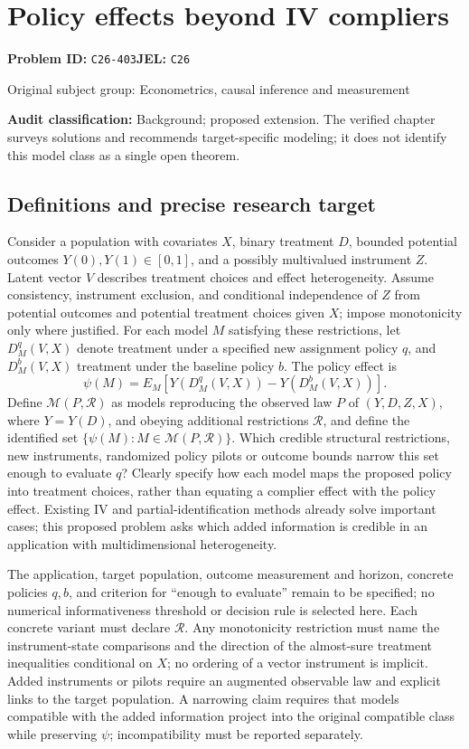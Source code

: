 \documentclass[11pt,a4paper]{article}
\begin{document}
\section*{Policy effects beyond IV compliers}
\textbf{Problem ID:} \texttt{C26-403}\quad \textbf{JEL:} \texttt{C26}\par
\label{problem:OP-0424}
{\sffamily\small\color{muted}Original subject group: Econometrics, causal inference and measurement\par}
\label{definitions:problem:30007706}
\textbf{Audit classification:} Background; proposed extension. The verified chapter surveys solutions and recommends target-specific modeling; it does not identify this model class as a single open theorem.
\subsection*{Definitions and precise research target}
Consider a population with covariates \(X\), binary treatment \(D\), bounded potential outcomes \(Y(0),Y(1)\in[0,1]\), and a possibly multivalued instrument \(Z\). Latent vector \(V\) describes treatment choices and effect heterogeneity. Assume consistency, instrument exclusion, and conditional independence of \(Z\) from potential outcomes and potential treatment choices given \(X\); impose monotonicity only where justified. For each model \(M\) satisfying these restrictions, let \(D_M^q(V,X)\) denote treatment under a specified new assignment policy \(q\), and \(D_M^b(V,X)\) treatment under the baseline policy \(b\). The policy effect is
\[
\psi(M)=E_M[Y(D_M^q(V,X))-Y(D_M^b(V,X))].
\]
Define \(\mathcal M(P,\mathcal R)\) as models reproducing the observed law \(P\) of \((Y,D,Z,X)\), where \(Y=Y(D)\), and obeying additional restrictions \(\mathcal R\), and define the identified set \(\{\psi(M):M\in\mathcal M(P,\mathcal R)\}\). Which credible structural restrictions, new instruments, randomized policy pilots or outcome bounds narrow this set enough to evaluate \(q\)? Clearly specify how each model maps the proposed policy into treatment choices, rather than equating a complier effect with the policy effect. Existing IV and partial-identification methods already solve important cases; this proposed problem asks which added information is credible in an application with multidimensional heterogeneity.

The application, target population, outcome measurement and horizon, concrete policies \(q,b\), and criterion for ``enough to evaluate'' remain to be specified; no numerical informativeness threshold or decision rule is selected here. Each concrete variant must declare \(\mathcal R\). Any monotonicity restriction must name the instrument-state comparisons and the direction of the almost-sure treatment inequalities conditional on \(X\); no ordering of a vector instrument is implicit. Added instruments or pilots require an augmented observable law and explicit links to the target population. A narrowing claim requires that models compatible with the added information project into the original compatible class while preserving \(\psi\); incompatibility must be reported separately.
\end{document}
